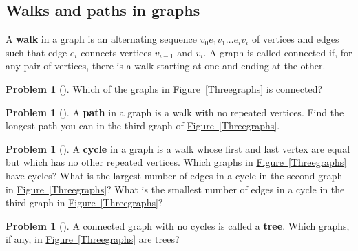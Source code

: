 \documentclass[10pt,]{book}
\newcommand{\terminology}[1]{\textbf{#1}}
\theoremstyle{plain}
\theoremstyle{definition}
\newtheorem{activity}[project]{Problem}
\theoremstyle{definition}
\numberwithin{equation}{chapter}
\begin{document}
\subsection[{Walks and paths in graphs}]{Walks and paths in graphs}\label{subsection-22}
\hypertarget{p-613}{}%
A \terminology{walk} in a graph is an alternating sequence \(v_0e_1v_1\ldots
e_iv_i\) of vertices and edges such that edge \(e_i\) connects vertices \(v_{i-1}\) and \(v_i\). A graph is called connected if, for any pair of vertices, there is a walk starting at one and ending at the other.%
\begin{activity}[]\marginsymbol[-1em]{} \label{connectedanddisconnected}
\hypertarget{p-614}{}%
Which of the graphs in \hyperref[Threegraphs]{Figure~\ref{Threegraphs}} is connected?%
\end{activity}
\begin{activity}[] \label{activity-105}
\hypertarget{p-616}{}%
A \terminology{path} in a graph is a walk with no repeated vertices.  Find the longest path you can in the third graph of \hyperref[Threegraphs]{Figure~\ref{Threegraphs}}.%
\end{activity}
\begin{activity}[] \label{activity-106}
\hypertarget{p-618}{}%
A \terminology{cycle} in a graph is a walk whose first and last vertex are equal but which has no other repeated vertices.  Which graphs in \hyperref[Threegraphs]{Figure~\ref{Threegraphs}} have cycles?  What is the largest number of edges in a cycle in the second graph in \hyperref[Threegraphs]{Figure~\ref{Threegraphs}}?  What is the smallest number of edges in a cycle in the third graph in \hyperref[Threegraphs]{Figure~\ref{Threegraphs}}?%
\end{activity}
\begin{activity}[] \label{activity-107}
\hypertarget{p-620}{}%
A connected graph with no cycles is called a \terminology{tree}.  Which graphs, if any, in \hyperref[Threegraphs]{Figure~\ref{Threegraphs}} are trees?%
\end{activity}
\typeout{************************************************}
\typeout{************************************************}
\end{document}
